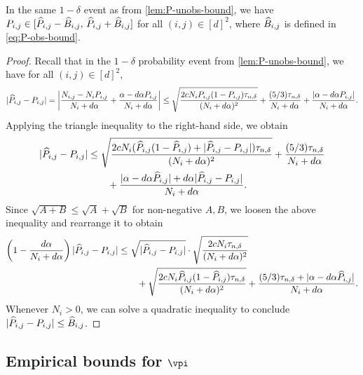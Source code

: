 \begin{lemma}
  \label{lem:P-obs-bound}
  In the same $1-\delta$ event as from \cref{lem:P-unobs-bound},
  we have
  $P_{i,j} \in [ \widehat{P}_{i,j} - \widehat{B}_{i,j},\, \widehat{P}_{i,j}
  + \widehat{B}_{i,j} ]$
  for all $(i,j) \in [d]^2$,
  where $\widehat{B}_{i,j}$ is defined in \cref{eq:P-obs-bound}.
\end{lemma}
\begin{proof}
  Recall that in the $1-\delta$ probability event from
  \cref{lem:P-unobs-bound}, we have for all $(i,j) \in [d]^2$,
  \begin{multline*}
    \abs{ \wh{P}_{i,j} - P_{i,j} }
    =
    \Abs{
      \frac{N_{i,j} - N_i P_{i,j}}{N_i + d\alpha}
      + \frac{\alpha - d\alpha P_{i,j}}{N_i + d\alpha}
    } %
    \leq
    \sqrt{\frac{2cN_iP_{i,j}(1-P_{i,j})\emptail}{(N_i+d\alpha)^2}}
    + \frac{(5/3)\emptail}{N_i+d\alpha}
    + \frac{\abs{\alpha-d\alpha P_{i,j}}}{N_i+d\alpha}
    .
  \end{multline*}
  Applying the triangle inequality to the right-hand side, we obtain
  \begin{align}
    | \widehat{P}_{i,j} - P_{i,j} |
    & \leq
    \sqrt{
      \frac{
        2cN_i(
          \widehat{P}_{i,j}(1-\widehat{P}_{i,j})
          + |\widehat{P}_{i,j} - P_{i,j}|
        ) \tau_{n,\delta}
      }{(N_i+d\alpha)^2}
    }
    + \frac{(5/3)\tau_{n,\delta}}{N_i+d\alpha}
    \notag \\
    & \qquad
    + \frac{
      |\alpha-d\alpha \widehat{P}_{i,j}|
      + d\alpha|\widehat{P}_{i,j}-P_{i,j}|
    }{N_i+d\alpha}
    .
    \notag
  \end{align}
  Since $\sqrt{A+B} \leq \sqrt{A} + \sqrt{B}$ for non-negative $A,B$, we
  loosen the above inequality and rearrange it to obtain
  \begin{align*}
    \left( 1 - \frac{d\alpha}{N_i+d\alpha} \right)
    |\widehat{P}_{i,j} - P_{i,j}|
    & \leq
    \sqrt{|\widehat{P}_{i,j} - P_{i,j}|} \cdot
    \sqrt{\frac{2cN_i\tau_{n,\delta}}{(N_i+d\alpha)^2}}
    \\
    & \qquad
    +
    \sqrt{\frac{2cN_i\widehat{P}_{i,j}(1-\widehat{P}_{i,j})\tau_{n,\delta}}{(N_i+d\alpha)^2}}
    + \frac{(5/3)\tau_{n,\delta} + |\alpha -
    d\alpha\widehat{P}_{i,j}|}{N_i+d\alpha}
    .
  \end{align*}
  Whenever $N_i > 0$, we can solve a quadratic inequality to conclude
  $|\widehat{P}_{i,j}-P_{i,j}| \leq \widehat{B}_{i,j}$.
\end{proof}

\subsection{Empirical bounds for $\vpi$}

